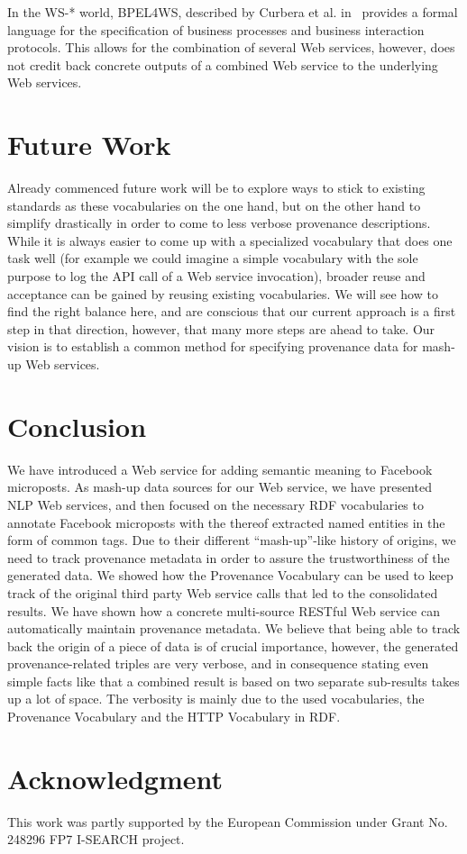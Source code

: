 \documentclass[conference]{IEEEtran}
\begin{document}
In the WS-* world, BPEL4WS, described by Curbera et al. in~\cite{Curbera:2003:NSW:944217.944234} provides a formal language for the specification of business processes and business interaction protocols. This allows for the combination of several Web services, however, does not credit back concrete outputs of a combined Web service to the underlying Web services.

\section{Future Work} \label{sec:future}
Already commenced future work will be to explore ways to stick to existing standards as these vocabularies on the one hand, but on the other hand to simplify drastically in order to come to less verbose provenance descriptions. While it is always easier to come up with a specialized vocabulary that does one task well (for example we could imagine a simple vocabulary with the sole purpose to log the API call of a Web service invocation), broader reuse and acceptance can be gained by reusing existing vocabularies. We will see how to find the right balance here, and are conscious that our current approach is a first step in that direction, however, that many more steps are ahead to take. Our vision is to establish a common method for specifying provenance data for mash-up Web services. 

\section{Conclusion}                                                        \label{sec:conclusion}
We have introduced a Web service for adding semantic meaning to Facebook microposts. As mash-up data sources for our Web service, we have presented NLP Web services, and then focused on the necessary RDF vocabularies to annotate Facebook microposts with the thereof extracted named entities in the form of common tags. Due to their different ``mash-up''-like history of origins, we need to track provenance metadata in order to assure the trustworthiness of the generated data. We showed how the Provenance Vocabulary can be used to keep track of the original third party Web service calls that led to the consolidated results. We have shown how a concrete multi-source RESTful Web service can automatically maintain provenance metadata. We believe that being able to track back the origin of a piece of data is of crucial importance, however, the generated provenance-related triples are very verbose, and in consequence stating even simple facts like that a combined result is based on two separate sub-results takes up a lot of space. The verbosity is mainly due to the used vocabularies, the Provenance Vocabulary and the HTTP Vocabulary in RDF.


\section*{Acknowledgment}

This work was partly supported by the European Commission under Grant No. 248296 FP7
I-SEARCH project.



\end{document}

